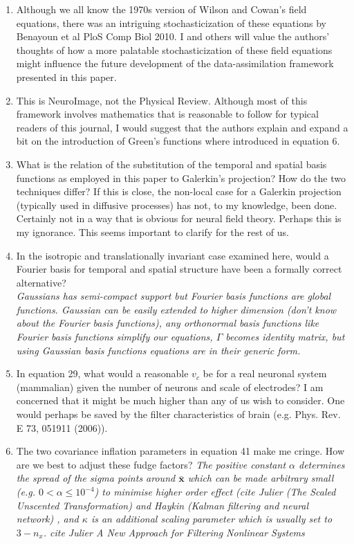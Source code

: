 \documentclass{article}
\begin{document}
\begin{enumerate}
	
\item Although we all know the 1970s version of Wilson and Cowan's field equations, there was an intriguing stochasticization of these equations by Benayoun et al PloS Comp Biol 2010. I and others will value the authors' thoughts of how a more palatable stochasticization of these field equations might influence the future development of the data-assimilation framework presented in this paper.

\item This is NeuroImage, not the Physical Review. Although most of this framework involves mathematics that is reasonable to follow for typical readers of this journal, I would suggest that the authors explain and expand a bit on the introduction of Green's functions where introduced in equation 6.

\item What is the relation of the substitution of the temporal and spatial basis functions as employed in this paper to Galerkin's projection? How do the two techniques differ? If this is close, the non-local case for a Galerkin projection (typically used in diffusive processes) has not, to my knowledge, been done. Certainly not in a way that is obvious for neural field theory. Perhaps this is my ignorance. This seems important to clarify for the rest of us.
\item In the isotropic and translationally invariant case examined here, would a Fourier basis for temporal and spatial structure have been a formally correct alternative?\\

\emph{Gaussians has semi-compact support but Fourier basis functions are global functions. Gaussian can be easily extended to higher dimension (don't know about the Fourier basis functions), any orthonormal basis functions like Fourier basis functions simplify our equations, $\Gamma$ becomes identity matrix, but using Gaussian basis functions equations are in their generic form.}

\item In equation 29, what would a reasonable $v_c$ be for a real neuronal system (mammalian) given the number of neurons and scale of electrodes? I am concerned that it might be much higher than any of us wish to consider. One would perhaps be saved by the filter characteristics of brain (e.g. Phys. Rev. E 73, 051911 (2006)).
\item The two covariance inflation parameters in equation 41 make me cringe. How are we best to adjust these fudge factors?
\emph{The positive constant $\alpha$ determines the spread of the sigma points around $\mathbf{\bar x}$ which can be made arbitrary small (e.g. $0<\alpha\le 10^{-4} $) to minimise higher order effect (cite Julier (The Scaled Unscented Transformation) and  Haykin (Kalman filtering and neural network) , and  $\kappa$ is an additional scaling parameter which is usually set to $3-n_x$. cite Julier A New Approach for Filtering Nonlinear Systems}




\end{enumerate}
\end{document}

